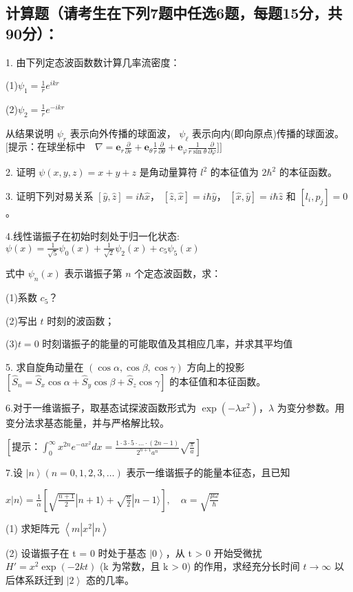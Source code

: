 \subsection{计算题（请考生在下列7题中任选6题，每题15分，共90分）：}

1. 由下列定态波函数数计算几率流密度：

(1)$\psi_1 = \frac{1}{r} e^{ikr}$ 


(2)$\psi_2 = \frac{1}{r} e^{-ikr}$

从结果说明 $\psi_r$ 表示向外传播的球面波， $\psi_\ell$ 表示向内(即向原点)传播的球面波。
$\text{[提示：在球坐标中}\quad \nabla = \mathbf{e}_r \frac{\partial}{\partial r} + \mathbf{e}_\theta \frac{1}{r} \frac{\partial}{\partial \theta} + \mathbf{e}_\varphi \frac{1}{r \sin \theta} \frac{\partial}{\partial \varphi}\text{]}]$

2. 证明 $\psi (x,y,z) = x + y + z$ 是角动量算符 $l^2$ 的本征值为 $2\hbar^2$ 的本征函数。

3. 证明下列对易关系 $[ \hat{y}, \hat{z} ] = i\hbar \hat{x}$， $[\hat{z}, \hat{x}] = i\hbar \hat{y}$， $[\hat{x}, \hat{y}] = i\hbar \hat{z}$ 和 $[l_i, p_j] = 0$。

4.线性谐振子在初始时刻处于归一化状态:
$\psi(x) = \frac{1}{\sqrt{5}} \psi_0(x) + \frac{1}{\sqrt{2}} \psi_2(x) + c_5 \psi_5(x)$

式中 $\psi_n(x)$ 表示谐振子第 $n$ 个定态波函数，求：

(1)系数 $c_5$？

(2)写出 $t$ 时刻的波函数；

(3)$t=0$ 时刻谐振子的能量的可能取值及其相应几率，并求其平均值

5. 求自旋角动量在 $(\cos \alpha, \cos \beta, \cos \gamma)$ 方向上的投影
$[\hat{S}_n = \hat{S}_x \cos \alpha + \hat{S}_y \cos \beta + \hat{S}_z \cos \gamma]$
的本征值和本征函数。

6.对于一维谐振子，取基态试探波函数形式为 $\exp(-\lambda x^2)$，$\lambda$ 为变分参数。用变分法求基态能量，并与严格解比较。

$\left[ \text{提示：} \int_{0}^{\infty} x^{2n} e^{-ax^2} dx = \frac{1 \cdot 3 \cdot 5 \cdot \ldots \cdot (2n-1)}{2^{n+1} a^n} \sqrt{\frac{\pi}{a}} \right]$

7.设 $\left| n \right\rangle (n = 0, 1, 2, 3, \ldots)$ 表示一维谐振子的能量本征态，且已知

$x|n\rangle = \frac{1}{\alpha} \left[ \sqrt{\frac{n+1}{2}} |n+1\rangle + \sqrt{\frac{n}{2}} |n-1\rangle \right], \quad \alpha = \sqrt{\frac{\mu \omega}{\hbar}}$

(1) 求矩阵元 $\left\langle m \left| x^2 \right| n \right\rangle$

(2) 设谐振子在 t = 0 时处于基态 $\left| 0 \right\rangle$，从 t > 0 开始受微扰 $H' = x^2 \exp(-2kt)$ (k 为常数，且 k > 0) 的作用，求经充分长时间 $t \to \infty$ 以后体系跃迁到 $\left| 2 \right\rangle$ 态的几率。
